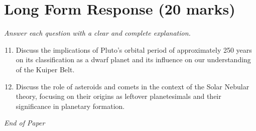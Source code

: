 \documentclass[12pt]{article}
\begin{document}
\section*{Long Form Response (20 marks)}
\textit{Answer each question with a clear and complete explanation.}
\begin{enumerate}[label=\arabic*.]
\setcounter{enumi}{10}
\item Discuss the implications of Pluto's orbital period of approximately 250 years on its classification as a dwarf planet and its influence on our understanding of the Kuiper Belt.
\item Discuss the role of asteroids and comets in the context of the Solar Nebular theory, focusing on their origins as leftover planetesimals and their significance in planetary formation.
\end{enumerate}

\vfill
\noindent\textit{End of Paper}
\end{document}
